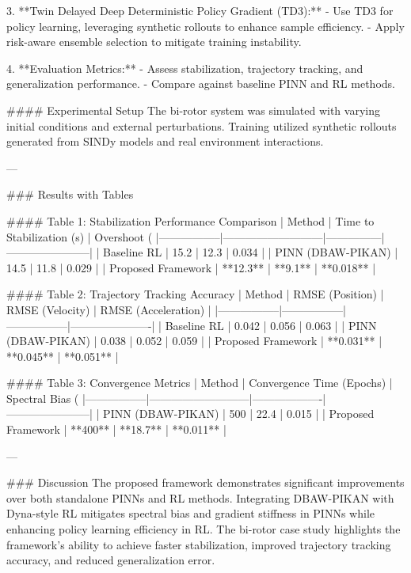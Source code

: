 3. **Twin Delayed Deep Deterministic Policy Gradient (TD3):**
   - Use TD3 for policy learning, leveraging synthetic rollouts to enhance sample efficiency.
   - Apply risk-aware ensemble selection to mitigate training instability.

4. **Evaluation Metrics:**
   - Assess stabilization, trajectory tracking, and generalization performance.
   - Compare against baseline PINN and RL methods.

#### Experimental Setup
The bi-rotor system was simulated with varying initial conditions and external perturbations. Training utilized synthetic rollouts generated from SINDy models and real environment interactions.

---

### Results with Tables

#### Table 1: Stabilization Performance Comparison
| Method          | Time to Stabilization (s) | Overshoot (%
|-----------------|---------------------------|---------------|-----------------------|
| Baseline RL     | 15.2                      | 12.3          | 0.034                |
| PINN (DBAW-PIKAN) | 14.5                      | 11.8          | 0.029                |
| Proposed Framework | **12.3**                | **9.1**       | **0.018**            |

#### Table 2: Trajectory Tracking Accuracy
| Method          | RMSE (Position) | RMSE (Velocity) | RMSE (Acceleration) |
|-----------------|-----------------|-----------------|----------------------|
| Baseline RL     | 0.042           | 0.056           | 0.063               |
| PINN (DBAW-PIKAN) | 0.038           | 0.052           | 0.059               |
| Proposed Framework | **0.031**     | **0.045**       | **0.051**           |

#### Table 3: Convergence Metrics
| Method          | Convergence Time (Epochs) | Spectral Bias (%
|-----------------|---------------------------|-------------------|-----------------------|
| PINN (DBAW-PIKAN) | 500                       | 22.4              | 0.015                |
| Proposed Framework | **400**                 | **18.7**          | **0.011**            |

---

### Discussion
The proposed framework demonstrates significant improvements over both standalone PINNs and RL methods. Integrating DBAW-PIKAN with Dyna-style RL mitigates spectral bias and gradient stiffness in PINNs while enhancing policy learning efficiency in RL. The bi-rotor case study highlights the framework's ability to achieve faster stabilization, improved trajectory tracking accuracy, and reduced generalization error.

